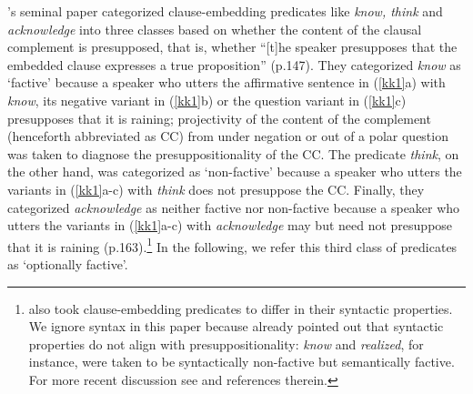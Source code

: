 \documentclass[11pt,fleqn]{article}
\newcommand{\6}{\mbox{$[\hspace*{-.6mm}[$}}
\newcommand{\9}{\mbox{$]\hspace*{-.6mm}]$}}
\newcommand{\citepos}[1]{\citeauthor{#1}'s \citeyear{#1}}
\begin{document}
\citepos{kiparsky-kiparsky70} seminal paper categorized clause-embedding predicates like {\em know, think} and {\em acknowledge} into three classes based on whether the content of the clausal complement is presupposed, that is, whether ``[t]he speaker presupposes that the embedded clause expresses a true proposition'' (p.147). They categorized {\em know} as `factive' because a speaker who utters the affirmative sentence in (\ref{kk1}a) with {\em know}, its negative variant in (\ref{kk1}b) or the question variant in (\ref{kk1}c) presupposes that it is raining; projectivity of the content of the complement (henceforth abbreviated as CC) from under negation or out of a polar question was taken to diagnose the presuppositionality of the CC. The predicate {\em think}, on the other hand, was categorized as `non-factive' because a speaker who utters the variants in (\ref{kk1}a-c) with {\em think} does not presuppose the CC. Finally, they categorized {\em acknowledge} as neither factive nor non-factive because a speaker who utters the variants in (\ref{kk1}a-c) with {\em acknowledge} may but need not presuppose that it is raining (p.163).\footnote{\citet{kiparsky-kiparsky70} also took clause-embedding predicates to differ in their syntactic properties. We ignore syntax in this paper because \citet[fn.3]{kiparsky-kiparsky70} already pointed out that syntactic properties do not align with presuppositionality: {\em know} and {\em realized}, for instance, were taken to be syntactically non-factive but semantically factive. For more recent discussion see \citealt{white-rawlins-nels2018} and references therein.} In the following, we refer this third class of predicates as `optionally factive'.
\end{document}
